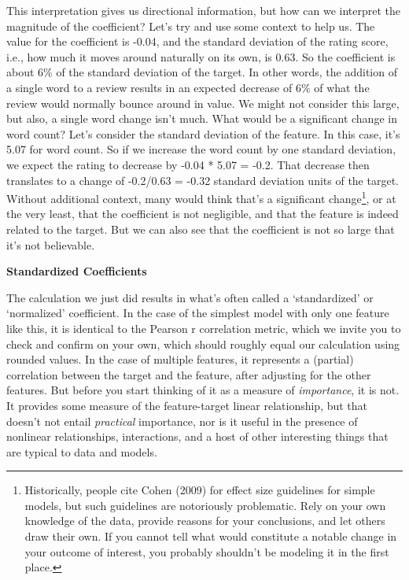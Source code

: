 \documentclass[
  letterpaper,
]{krantz}
\begin{document}
This interpretation gives us directional information, but how can we
interpret the magnitude of the coefficient? Let's try and use some
context to help us. The value for the coefficient is -0.04, and the
standard deviation of the rating score, i.e., how much it moves around
naturally on its own, is 0.63. So the coefficient is about 6\% of the
standard deviation of the target. In other words, the addition of a
single word to a review results in an expected decrease of 6\% of what
the review would normally bounce around in value. We might not consider
this large, but also, a single word change isn't much. What would be a
significant change in word count? Let's consider the standard deviation
of the feature. In this case, it's 5.07 for word count. So if we
increase the word count by one standard deviation, we expect the rating
to decrease by -0.04 * 5.07 = -0.2. That decrease then translates to a
change of -0.2/0.63 = -0.32 standard deviation units of the target.
Without additional context, many would think that's a significant
change\footnote{Historically, people cite Cohen (2009) for effect size
  guidelines for simple models, but such guidelines are notoriously
  problematic. Rely on your own knowledge of the data, provide reasons
  for your conclusions, and let others draw their own. If you cannot
  tell what would constitute a notable change in your outcome of
  interest, you probably shouldn't be modeling it in the first place.},
or at the very least, that the coefficient is not negligible, and that
the feature is indeed related to the target. But we can also see that
the coefficient is not so large that it's not believable.

\begin{tcolorbox}[enhanced jigsaw, opacityback=0, leftrule=.75mm, bottomrule=.15mm, colframe=quarto-callout-tip-color-frame, rightrule=.15mm, breakable, left=2mm, colback=white, arc=.35mm, toprule=.15mm]

\vspace{-3mm}\textbf{Standardized Coefficients}\vspace{3mm}

The calculation we just did results in what's often called a
`standardized' or `normalized' coefficient. In the case of the simplest
model with only one feature like this, it is identical to the Pearson r
correlation metric, which we invite you to check and confirm on your
own, which should roughly equal our calculation using rounded values. In
the case of multiple features, it represents a (partial) correlation
between the target and the feature, after adjusting for the other
features. But before you start thinking of it as a measure of
\emph{importance}, it is not. It provides some measure of the
feature-target linear relationship, but that doesn't not entail
\emph{practical} importance, nor is it useful in the presence of
nonlinear relationships, interactions, and a host of other interesting
things that are typical to data and models.

\end{tcolorbox}
\end{document}
